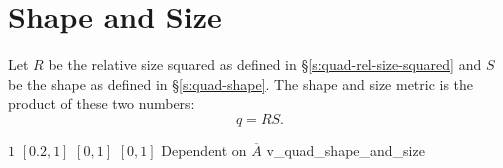 \section{Shape and Size\label{s:quad-shape-and-size}}

Let $R$ be the relative size squared as defined in \S\ref{s:quad-rel-size-squared}
and $S$ be the shape as defined in \S\ref{s:quad-shape}.
The shape and size metric is the product of these two numbers:
\[
q = R S.
\]

%
{$1$}%
{$[0.2,1]$}%
{$[0,1]$}%
{$[0,1]$}%
{Dependent on $\overline{A}$}%
{\cite{knu:03}}%
{v\_quad\_shape\_and\_size}%

